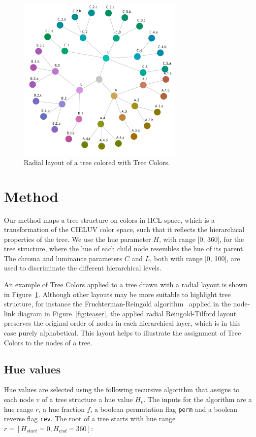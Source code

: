 \documentclass[journal]{vgtc}                %
\begin{document}
\begin{figure}[!b]

  \centering
  \includegraphics[width=3.2in]{HCPgraph.pdf}
  \caption{Radial layout of a tree colored with Tree Colors.}\label{fig:graph}

\end{figure}


\section{Method}\label{secmethod}
Our method maps a tree structure on colors in HCL space, which is a transformation of the CIELUV color space, such that it reflects the hierarchical properties of the tree. We use the hue parameter $H$, with range [0, 360], for the tree structure, where the hue of each child node resembles the hue of its parent. The chroma and luminance parameters $C$ and $L$, both with range [0, 100], are used to discriminate the different hierarchical levels.

An example of Tree Colors applied to a tree drawn with a radial layout is shown in Figure~\ref{fig:graph}. 
Although other layouts may be more suitable to highlight tree structure, for instance the Fruchterman-Reingold algorithm~\cite{Fruchterman91} applied in the node-link diagram in Figure~\ref{fig:teaser}, the applied radial Reingold-Tilford layout~\cite{reingold81} preserves the original order of nodes in each hierarchical layer, which is in this case purely alphabetical. This layout helps to illustrate the assignment of Tree Colors to the nodes of a tree. 


\subsection{Hue values}
Hue values are selected using the following recursive algorithm that assigns to each node 
$v$ of a tree structure a hue value $H_{v}$. 
The inputs for the algorithm are a hue range $r$, a hue fraction $f$, a boolean permutation flag  
\texttt{perm} and a boolean reverse flag \texttt{rev}.
The root of a tree starts with hue range $r=[H_{start}=0, H_{end}=360]$:
\end{document}
